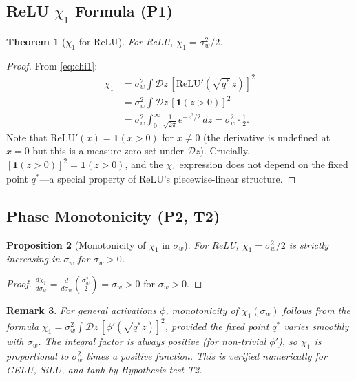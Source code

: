 \documentclass[10pt]{article}
\newtheorem{theorem}{Theorem}
\newtheorem{proposition}[theorem]{Proposition}
\newtheorem{remark}[theorem]{Remark}
\begin{document}
\subsection{ReLU $\chi_1$ Formula (P1)}

\begin{theorem}[$\chi_1$ for ReLU]
\label{thm:chi1-relu}
For ReLU, $\chi_1 = \sigma_w^2 / 2$.
\end{theorem}

\begin{proof}
From \eqref{eq:chi1}:
\begin{align}
\chi_1 &= \sigma_w^2 \int \mathcal{D}z\, [\text{ReLU}'(\sqrt{q^*}\, z)]^2 \\
&= \sigma_w^2 \int \mathcal{D}z\, [\mathbf{1}(z > 0)]^2 \\
&= \sigma_w^2 \int_0^{\infty} \frac{1}{\sqrt{2\pi}} e^{-z^2/2}\, dz = \sigma_w^2 \cdot \frac{1}{2}.
\end{align}
Note that $\text{ReLU}'(x) = \mathbf{1}(x > 0)$ for $x \neq 0$ (the derivative is undefined at $x=0$ but this is a measure-zero set under $\mathcal{D}z$).
Crucially, $[\mathbf{1}(z>0)]^2 = \mathbf{1}(z>0)$, and the $\chi_1$ expression does not depend on the fixed point $q^*$---a special property of ReLU's piecewise-linear structure.
\end{proof}

\subsection{Phase Monotonicity (P2, T2)}

\begin{proposition}[Monotonicity of $\chi_1$ in $\sigma_w$]
\label{prop:monotonicity}
For ReLU, $\chi_1 = \sigma_w^2/2$ is strictly increasing in $\sigma_w$ for $\sigma_w > 0$.
\end{proposition}

\begin{proof}
$\frac{d\chi_1}{d\sigma_w} = \frac{d}{d\sigma_w}\left(\frac{\sigma_w^2}{2}\right) = \sigma_w > 0$ for $\sigma_w > 0$.
\end{proof}

\begin{remark}
For general activations $\phi$, monotonicity of $\chi_1(\sigma_w)$ follows from the formula $\chi_1 = \sigma_w^2 \int \mathcal{D}z\,[\phi'(\sqrt{q^*}z)]^2$, provided the fixed point $q^*$ varies smoothly with $\sigma_w$.
The integral factor is always positive (for non-trivial $\phi'$), so $\chi_1$ is proportional to $\sigma_w^2$ times a positive function.
This is verified numerically for GELU, SiLU, and tanh by Hypothesis test T2.
\end{remark}
\end{document}
